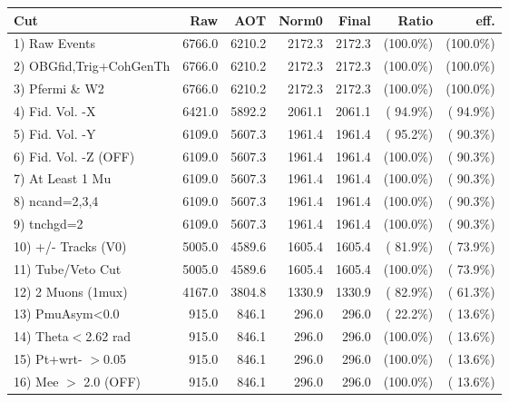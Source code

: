  \begin{table}[h!]\centering
 \begin{tabular}{||l||r|r|r|r|r|r||}
 \hline
 \hline
 Cut & Raw & AOT & Norm0 & Final & Ratio & eff.       \\
 \hline
  1) Raw Events           &       6766.0 &       6210.2 &       2172.3 &       2172.3 & (100.0\%) & (100.0\%) \\
  2) OBGfid,Trig+CohGenTh &       6766.0 &       6210.2 &       2172.3 &       2172.3 & (100.0\%) & (100.0\%) \\
  3) Pfermi \& W2         &       6766.0 &       6210.2 &       2172.3 &       2172.3 & (100.0\%) & (100.0\%) \\
  4) Fid. Vol. -X         &       6421.0 &       5892.2 &       2061.1 &       2061.1 & ( 94.9\%) & ( 94.9\%) \\
  5) Fid. Vol. -Y         &       6109.0 &       5607.3 &       1961.4 &       1961.4 & ( 95.2\%) & ( 90.3\%) \\
  6) Fid. Vol. -Z (OFF)   &       6109.0 &       5607.3 &       1961.4 &       1961.4 & (100.0\%) & ( 90.3\%) \\
  7) At Least 1 Mu        &       6109.0 &       5607.3 &       1961.4 &       1961.4 & (100.0\%) & ( 90.3\%) \\
  8) ncand=2,3,4          &       6109.0 &       5607.3 &       1961.4 &       1961.4 & (100.0\%) & ( 90.3\%) \\
  9) tnchgd=2             &       6109.0 &       5607.3 &       1961.4 &       1961.4 & (100.0\%) & ( 90.3\%) \\
 10) +/- Tracks (V0)      &       5005.0 &       4589.6 &       1605.4 &       1605.4 & ( 81.9\%) & ( 73.9\%) \\
 11) Tube/Veto Cut        &       5005.0 &       4589.6 &       1605.4 &       1605.4 & (100.0\%) & ( 73.9\%) \\
 12) 2 Muons (1mux)       &       4167.0 &       3804.8 &       1330.9 &       1330.9 & ( 82.9\%) & ( 61.3\%) \\
 13) PmuAsym<0.0          &        915.0 &        846.1 &        296.0 &        296.0 & ( 22.2\%) & ( 13.6\%) \\
 14) Theta$<$2.62 rad     &        915.0 &        846.1 &        296.0 &        296.0 & (100.0\%) & ( 13.6\%) \\
 15) Pt+wrt- $>$0.05      &        915.0 &        846.1 &        296.0 &        296.0 & (100.0\%) & ( 13.6\%) \\
 16) Mee $>$ 2.0  (OFF)   &        915.0 &        846.1 &        296.0 &        296.0 & (100.0\%) & ( 13.6\%) \\

\end{tabular}
\end{table}
